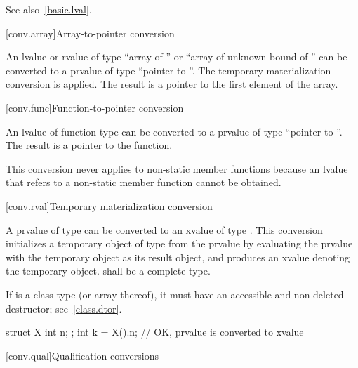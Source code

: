 \pnum
\begin{note}
See also~\ref{basic.lval}.
\end{note}

[conv.array]{Array-to-pointer conversion}

\pnum
{}%
%
%
An lvalue or rvalue of type ``array of  '' or ``array
of unknown bound of '' can be converted to a prvalue of type
``pointer to ''.
The temporary materialization conversion is applied.
The result is a pointer to the first element of the array.

[conv.func]{Function-to-pointer conversion}

\pnum
{}%
An lvalue of function type  can be converted to a prvalue of
type ``pointer to ''. The result is a pointer to the
function.
\begin{footnote}
This conversion never applies to non-static member functions because an
lvalue that refers to a non-static member function cannot be obtained.
\end{footnote}

[conv.rval]{Temporary materialization conversion}
%

\pnum
A prvalue of type  can be converted to an xvalue of type .
This conversion initializes a temporary object of type  from the prvalue
by evaluating the prvalue with the temporary object as its result object,
and produces an xvalue denoting the temporary object.
 shall be a complete type.
\begin{note}
If  is a class type (or array thereof),
it must have an accessible and non-deleted destructor;
see~\ref{class.dtor}.
\end{note}
\begin{example}
\begin{codeblock}
struct X { int n; };
int k = X().n;      // OK,  prvalue is converted to xvalue
\end{codeblock}
\end{example}

[conv.qual]{Qualification conversions}

